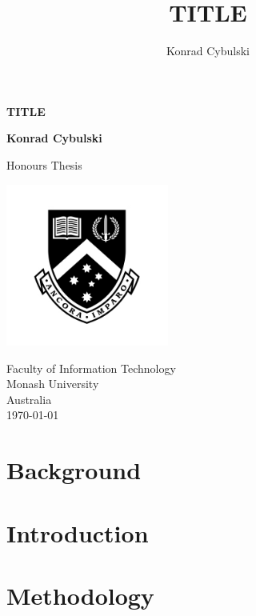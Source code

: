 \documentclass[10pt,a4paper]{article}
\author{Konrad Cybulski}
\title{TITLE}
\begin{document}
\begin{titlepage}
    \begin{center}
        \vspace*{1cm}
        
        \LARGE
        \textbf{TITLE}
        
        \vspace{2cm}
        \Large
        
        \textbf{Konrad Cybulski}
        
        \vfill
        
        Honours Thesis
        
        \vspace{0.8cm}
        
        \includegraphics[width=0.4\textwidth]{images/monash_emblem.jpg}
        
        \large
        Faculty of Information Technology\\
        Monash University\\
        Australia\\
		\today
        
    \end{center}
\end{titlepage}

\begin{Large}

\end{Large}

\pagebreak
\tableofcontents
\pagebreak

\section{Background}

\section{Introduction}

\section{Methodology}
\end{document}
